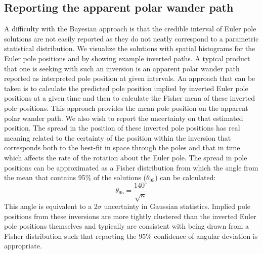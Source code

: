 \documentclass[11pt,letterpaper]{article}
\begin{document}
\subsection*{Reporting the apparent polar wander path}
\label{sec:age_uncertainty}
A difficulty with the Bayesian approach is that the credible interval of Euler pole solutions are not easily reported as they do not neatly correspond to a parametric statistical distribution.  We visualize the solutions with spatial histograms for the Euler pole positions and by showing example inverted paths. A typical product that one is seeking with such an inversion is an apparent polar wander path reported as interpreted pole position at given intervals. An approach that can be taken is to calculate the predicted pole position implied by inverted Euler pole positions at a given time and then to calculate the Fisher mean of these inverted pole positions.  This approach provides the mean pole position on the apparent polar wander path. We also wish to report the uncertainty on that estimated position. The spread in the position of these inverted pole positions has real meaning related to the certainty of the position within the inversion that corresponds both to the best-fit in space through the poles and that in time which affects the rate of the rotation about the Euler pole. The spread in pole positions can be approximated as a Fisher distribution from which the angle from the mean that contains 95$\%$ of the solutions ($\theta_{95}$) can be calculated:
\begin{equation}
\theta_{95}=\frac{140^{\circ}}{\sqrt{\kappa}}
\label{eq:angular_deviation}
\end{equation}
This angle is equivalent to a 2$\sigma$ uncertainty in Gaussian statistics. Implied pole positions from these inversions are more tightly clustered than the inverted Euler pole positions themselves and typically are consistent with being drawn from a Fisher distribution such that reporting the 95$\%$ confidence of angular deviation is appropriate.
\end{document}
